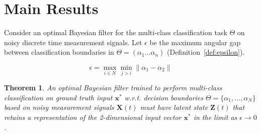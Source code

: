 \documentclass[12pt]{article}
\newtheorem{theorem}{Theorem}
\begin{document}
\section{Main Results}
\label{sec:main}

Consider an optimal Bayesian filter for the multi-class classification task
$\Theta$ on noisy discrete time measurement signals. 
Let $\epsilon$ be the maximum angular gap between classification boundaries in $\Theta=(\alpha_1 \dots \alpha_n)$ (Definition~\ref{def:epsilon}).

\begin{equation}
	\label{def:epsilon}
	\epsilon = \max_{i \in N} \min_{j > i} \| \alpha_1 - \alpha_2 \|
\end{equation}

\begin{theorem}
	\label{thm:main}
	An optimal Bayesian filter trained to perform multi-class classification on
	ground truth input $\mathbf x^*$ w.r.t. decision boundaries 
	$\Theta = \{\alpha_1, \dots, \alpha_N\}$ based on noisy measurement signals
	$\mathbf X(t)$ must have latent state $\mathbf Z(t)$ that retains a
	representation of the 2-dimensional input vector $\mathbf x^*$ in the limit 
	as $\epsilon \to 0$. 
\end{theorem}
\end{document}
